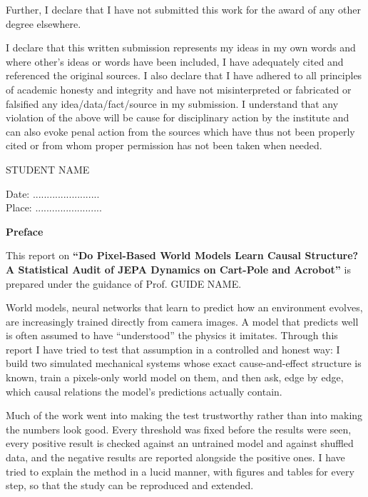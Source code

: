 \documentclass[11pt, a4paper, oneside,enumerate,textcomp]{report}
\newcommand{\BTPTitle}{Do Pixel-Based World Models Learn Causal Structure? A Statistical Audit of JEPA Dynamics on Cart-Pole and Acrobot}
\newcommand{\StudentName}{STUDENT NAME}
\newcommand{\GuideName}{Prof. GUIDE NAME}
\begin{document}
\par Further, I declare that I have not submitted this work for the award of any other degree elsewhere.

\par I declare that this written submission represents my ideas in my own words and where other's ideas or words have been included, I have adequately cited and referenced the original sources. I also declare that I have adhered to all principles of academic honesty and integrity and have not misinterpreted or fabricated or falsified any idea/data/fact/source in my submission. I understand that any violation of the above will be cause for disciplinary action by the institute and can also evoke penal action from the sources which have thus not been properly cited or from whom proper permission has not been taken when needed.
\vspace{1.5cm}
\begin{flushright}
	\StudentName
\end{flushright}

\begin{flushleft}
	Date: ........................\\
	Place: ........................\\
\end{flushleft}


\newpage
\vspace*{1cm}
\begin{center}
	{\Large\bf Preface}
\end{center}

This report on \textbf{``\BTPTitle''} is prepared under the guidance of \GuideName.

World models, neural networks that learn to predict how an environment evolves, are increasingly trained directly from camera images. A model that predicts well is often assumed to have ``understood'' the physics it imitates. Through this report I have tried to test that assumption in a controlled and honest way: I build two simulated mechanical systems whose exact cause-and-effect structure is known, train a pixels-only world model on them, and then ask, edge by edge, which causal relations the model's predictions actually contain.

Much of the work went into making the test trustworthy rather than into making the numbers look good. Every threshold was fixed before the results were seen, every positive result is checked against an untrained model and against shuffled data, and the negative results are reported alongside the positive ones. I have tried to explain the method in a lucid manner, with figures and tables for every step, so that the study can be reproduced and extended.
\end{document}
